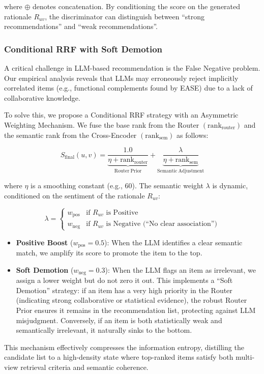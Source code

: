 where $\oplus$ denotes concatenation. By conditioning the score on the generated rationale $R_{uv}$, the discriminator can distinguish between ``strong recommendations'' and ``weak recommendations''.

\subsubsection{Conditional RRF with Soft Demotion}

A critical challenge in LLM-based recommendation is the False Negative problem. Our empirical analysis reveals that LLMs may erroneously reject implicitly correlated items (e.g., functional complements found by EASE) due to a lack of collaborative knowledge.

To solve this, we propose a Conditional RRF strategy with an Asymmetric Weighting Mechanism. We fuse the base rank from the Router $\left( \mathrm{rank}_{\mathrm{router}} \right)$ and the semantic rank from the Cross-Encoder $\left( \mathrm{rank}_{\mathrm{sem}} \right)$ as follows:

\begin{equation}
S_{\mathrm{final}}\left( u,v \right) = \underbrace{\frac{1.0}{\eta + \mathrm{rank}_{\mathrm{router}}}}_{\mathrm{Router\ Prior}} + \underbrace{\frac{\lambda}{\eta + \mathrm{rank}_{\mathrm{sem}}}}_{\mathrm{Semantic\ Adjustment}}
\end{equation}

where $\eta$ is a smoothing constant (e.g., 60). The semantic weight $\lambda$ is dynamic, conditioned on the sentiment of the rationale $R_{uv}$:

\begin{equation}
\lambda = \begin{cases}
w_{\mathrm{pos}} & \text{if } R_{uv} \text{ is Positive} \\
w_{\mathrm{neg}} & \text{if } R_{uv} \text{ is Negative (``No clear association'')}
\end{cases}
\end{equation}

\begin{itemize}
    \item \textbf{Positive Boost} ($w_{\mathrm{pos}}=0.5$): When the LLM identifies a clear semantic match, we amplify its score to promote the item to the top.
    \item \textbf{Soft Demotion} ($w_{\mathrm{neg}}=0.3$): When the LLM flags an item as irrelevant, we assign a lower weight but do not zero it out. This implements a ``Soft Demotion'' strategy: if an item has a very high priority in the Router (indicating strong collaborative or statistical evidence), the robust Router Prior ensures it remains in the recommendation list, protecting against LLM misjudgment. Conversely, if an item is both statistically weak and semantically irrelevant, it naturally sinks to the bottom.
\end{itemize}

This mechanism effectively compresses the information entropy, distilling the candidate list to a high-density state where top-ranked items satisfy both multi-view retrieval criteria and semantic coherence.